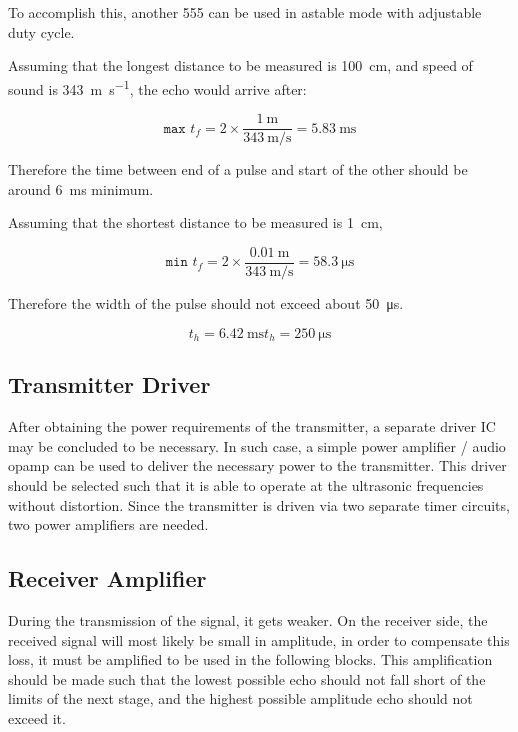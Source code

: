 \documentclass[12pt, a4paper]{article}
\begin{document}
	\bigskip
	To accomplish this, another 555 can be used in astable mode with adjustable duty cycle.
	
	\bigskip
	 Assuming that the longest distance to be measured is \SI{100}{\centi\metre}, and speed of sound is \SI{343}{\metre\per\second}, the echo would arrive after:

    \begin{equation}
        \texttt{max }t_f = 2 \times \frac{\SI{1}{\metre}}{\SI{343}{\metre\per\second}} = \SI{5.83}{\milli\second}
    \end{equation}

    \noindent Therefore the time between end of a pulse and start of the other should be around \SI{6}{\milli\second} minimum. 

    \noindent Assuming that the shortest distance to be measured is \SI{1}{\centi\metre}, 

    \begin{equation}
        \texttt{min }t_f = 2 \times \frac{\SI{0.01}{\metre}}{\SI{343}{\metre\per\second}} = \SI{58.3}{\micro\second}
    \end{equation}

    \noindent Therefore the width of the pulse should not exceed about \SI{50}{\micro\second}.

 \begin{equation}
        \texttt{}t_h = \SI{6.42}{\milli\second}
         \texttt{}t_h = \SI{250}{\micro\second}
    \end{equation}

	\subsection{Transmitter Driver}
	After obtaining the power requirements of the transmitter, a separate driver IC may be concluded to be necessary. In such case, a simple power amplifier / audio opamp can be used to deliver the necessary power to the transmitter. This driver should be selected such that it is able to operate at the ultrasonic frequencies without distortion. Since the transmitter is driven via two separate timer circuits, two power amplifiers are needed. 
	
	\subsection{Receiver Amplifier}
	During the transmission of the signal, it gets weaker.  On the receiver side, the received signal will most likely be small in amplitude, in order to compensate this loss, it must be amplified to be used in the following blocks. This amplification should be made such that the lowest possible echo should not fall short of the limits of the next stage, and the highest possible amplitude echo should not exceed it.
\end{document}
